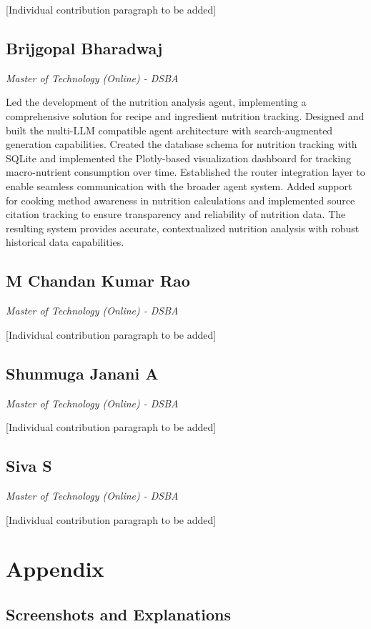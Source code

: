 \documentclass{ecai}
\begin{document}
[Individual contribution paragraph to be added]

\subsection*{Brijgopal Bharadwaj}
\textit{Master of Technology (Online) - DSBA}

Led the development of the nutrition analysis agent, implementing a comprehensive solution for recipe and ingredient nutrition tracking. Designed and built the multi-LLM compatible agent architecture with search-augmented generation capabilities. Created the database schema for nutrition tracking with SQLite and implemented the Plotly-based visualization dashboard for tracking macro-nutrient consumption over time. Established the router integration layer to enable seamless communication with the broader agent system. Added support for cooking method awareness in nutrition calculations and implemented source citation tracking to ensure transparency and reliability of nutrition data. The resulting system provides accurate, contextualized nutrition analysis with robust historical data capabilities.

\subsection*{M Chandan Kumar Rao}
\textit{Master of Technology (Online) - DSBA}

[Individual contribution paragraph to be added]

\subsection*{Shunmuga Janani A}
\textit{Master of Technology (Online) - DSBA}

[Individual contribution paragraph to be added]

\subsection*{Siva S}
\textit{Master of Technology (Online) - DSBA}

[Individual contribution paragraph to be added]

\clearpage
\section*{Appendix}

\subsection*{Screenshots and Explanations}
\end{document}
